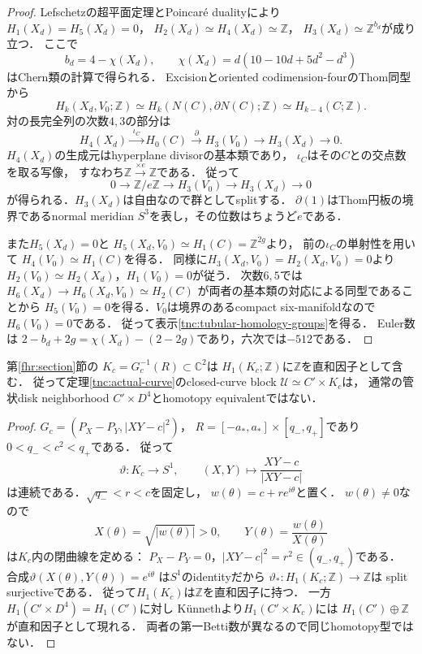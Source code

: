 \begin{proof}
Lefschetzの超平面定理とPoincar\'e dualityにより
$H_1(X_d)=H_5(X_d)=0$，
$H_2(X_d)\simeq H_4(X_d)\simeq\mathbb Z$，
$H_3(X_d)\simeq\mathbb Z^{b_d}$が成り立つ．
ここで
\[
 b_d=4-\chi(X_d),\qquad
 \chi(X_d)=d(10-10d+5d^2-d^3)
\]
はChern類の計算で得られる．
Excisionとoriented codimension-fourのThom同型から
\begin{equation}\label{tnc:thom-pair}
 H_k(X_d,V_0;\mathbb Z)
 \simeq H_k(N(C),\partial N(C);\mathbb Z)
 \simeq H_{k-4}(C;\mathbb Z).
\end{equation}
対の長完全列の次数$4,3$の部分は
\[
 H_4(X_d)\xrightarrow{\;\iota_C\;}H_0(C)
 \xrightarrow{\;\partial\;}H_3(V_0)
 \longrightarrow H_3(X_d)\longrightarrow0.
\]
$H_4(X_d)$の生成元はhyperplane divisorの基本類であり，
$\iota_C$はその$C$との交点数を取る写像，
すなわち$\mathbb Z\xrightarrow{\times e}\mathbb Z$である．
従って
\[
 0\longrightarrow \mathbb Z/e\mathbb Z
 \longrightarrow H_3(V_0)
 \longrightarrow H_3(X_d)\longrightarrow0
\]
が得られる．$H_3(X_d)$は自由なので群としてsplitする．
$\partial(1)$はThom円板の境界であるnormal meridian
$S^3$を表し，その位数はちょうど$e$である．

また$H_5(X_d)=0$と
$H_5(X_d,V_0)\simeq H_1(C)=\mathbb Z^{2g}$より，
前の$\iota_C$の単射性を用いて
$H_4(V_0)\simeq H_1(C)$を得る．
同様に$H_3(X_d,V_0)=H_2(X_d,V_0)=0$より
$H_2(V_0)\simeq H_2(X_d)$，$H_1(V_0)=0$が従う．
次数$6,5$では
$H_6(X_d)\to H_6(X_d,V_0)\simeq H_2(C)$
が両者の基本類の対応による同型であることから
$H_5(V_0)=0$を得る．$V_0$は境界のあるcompact
six-manifoldなので$H_6(V_0)=0$である．
従って表示\eqref{tnc:tubular-homology-groups}を得る．
Euler数は
$2-b_d+2g=\chi(X_d)-(2-2g)$であり，六次では$-512$である．
\end{proof}

\begin{lemma}
\label{tnc:focus-nondisk}
第\ref{fhr:section}節の
$K_c=G_c^{-1}(R)\subset\mathbb C^2$は
$H_1(K_c;\mathbb Z)$に$\mathbb Z$を直和因子として含む．
従って定理\ref{tnc:actual-curve}のclosed-curve block
$\mathcal U\simeq C'\times K_c$は，
通常の管状disk neighborhood
$C'\times D^4$とhomotopy equivalentではない．
\end{lemma}
\begin{proof}
$G_c=(P_X-P_Y,|XY-c|^2)$，
$R=[-a_*,a_*]\times[q_-,q_+]$であり
$0<q_-<c^2<q_+$である．
従って
\[
 \vartheta:K_c\longrightarrow S^1,\qquad
 (X,Y)\longmapsto\frac{XY-c}{|XY-c|}
\]
は連続である．$\sqrt{q_-}<r<c$を固定し，
$w(\theta)=c+r e^{i\theta}$と置く．
$w(\theta)\ne0$なので
\[
 X(\theta)=\sqrt{|w(\theta)|}>0,\qquad
 Y(\theta)=\frac{w(\theta)}{X(\theta)}
\]
は$K_c$内の閉曲線を定める：
$P_X-P_Y=0$，$|XY-c|^2=r^2\in(q_-,q_+)$である．
合成$\vartheta(X(\theta),Y(\theta))=e^{i\theta}$
は$S^1$のidentityだから
$\vartheta_*:H_1(K_c;\mathbb Z)\to\mathbb Z$は
split surjectiveである．
従って$H_1(K_c)$は$\mathbb Z$を直和因子に持つ．
一方$H_1(C'\times D^4)=H_1(C')$に対し
K\"unnethより$H_1(C'\times K_c)$には
$H_1(C')\oplus\mathbb Z$が直和因子として現れる．
両者の第一Betti数が異なるので同じhomotopy型ではない．
\end{proof}


